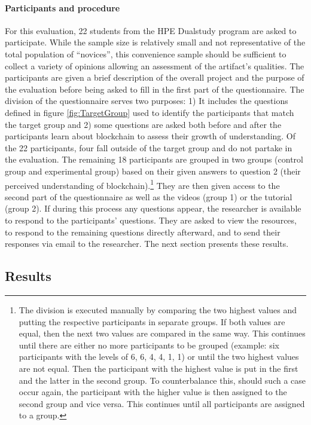 \paragraph{Participants and procedure}
For this evaluation, 22 students from the HPE Dualstudy program are asked to participate. While the sample size is relatively small and not representative of the total population of \enquote{novices}, this convenience sample should be sufficient to collect a variety of opinions allowing an assessment of the artifact's qualities. The participants are given a brief description of the overall project and the purpose of the evaluation before being asked to fill in the first part of the questionnaire. The division of the questionnaire serves two purposes: 1) It includes the questions defined in figure \ref{fig:TargetGroup} used to identify the participants that match the target group and 2) some questions are asked both before and after the participants learn about blockchain to assess their growth of understanding. Of the 22 participants, four fall outside of the target group and do not partake in the evaluation. The remaining 18 participants are grouped in two groups (control group and experimental group) based on their given answers to question 2 (their perceived understanding of blockchain).\footnote{The division is executed manually by comparing the two highest values and putting the respective participants in separate groups. If both values are equal, then the next two values are compared in the same way. This continues until there are either no more participants to be grouped (example: six participants with the levels of 6, 6, 4, 4, 1, 1) or until the two highest values are not equal. Then the participant with the highest value is put in the first and the latter in the second group. To counterbalance this, should such a case occur again, the participant with the higher value is then assigned to the second group and vice versa. This continues until all participants are assigned to a group.}
They are then given access to the second part of the questionnaire as well as the videos (group 1) or the tutorial (group 2). If during this process any questions appear, the researcher is available to respond to the participants' questions. They are asked to view the resources, to respond to the remaining questions directly afterward, and to send their responses via email to the researcher. The next section presents these results.

\subsection{Results} \label{subsec:EvaluationResults}

